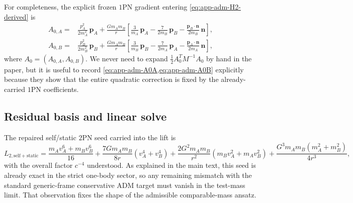 \documentclass[11pt]{article}
\newcommand{\pvec}{\mathbf p}
\newcommand{\nvec}{\mathbf n}
\newcommand{\OnePN}{\mathrm{1PN}}
\newcommand{\TwoPN}{\mathrm{2PN}}
\newcommand{\ADM}{\mathrm{ADM}}
\begin{document}
For completeness, the explicit frozen \(\OnePN\) gradient entering
\cref{eq:app-adm-H2-derived} is
\begin{align}
A_{0,A}
={}&
\frac{p_A^2}{2m_A^2}\,\pvec_A
+\frac{Gm_A m_B}{r}
\left[
\frac{3}{m_A}\,\pvec_A
-\frac{7}{2m_B}\,\pvec_B
-\frac{\pvec_B\!\cdot\!\nvec}{2m_B}\,\nvec
\right],
\label{eq:app-adm-A0A}
\\
A_{0,B}
={}&
\frac{p_B^2}{2m_B^2}\,\pvec_B
+\frac{Gm_A m_B}{r}
\left[
\frac{3}{m_B}\,\pvec_B
-\frac{7}{2m_A}\,\pvec_A
-\frac{\pvec_A\!\cdot\!\nvec}{2m_A}\,\nvec
\right],
\label{eq:app-adm-A0B}
\end{align}
where \(A_0=(A_{0,A},A_{0,B})\).  We never need to expand
\(\frac12 A_0^T M^{-1}A_0\) by hand in the paper, but it is useful to record
\cref{eq:app-adm-A0A,eq:app-adm-A0B} explicitly because they show that the entire
quadratic correction is fixed by the already-carried \(\OnePN\) coefficients.

\subsection{Residual basis and linear solve}
\label{app:adm-basis}

The repaired self/static \(\TwoPN\) seed carried into the lift is
\begin{equation}
L_{2,\mathrm{self+static}}
=
\frac{m_A v_A^6+m_B v_B^6}{16}
+\frac{7Gm_A m_B}{8r}(v_A^4+v_B^4)
+\frac{2G^2m_A m_B}{r^2}(m_B v_A^2+m_A v_B^2)
+\frac{G^3m_A m_B(m_A^2+m_B^2)}{4r^3},
\label{eq:app-adm-self-static-seed}
\end{equation}
with the overall factor \(c^{-4}\) understood.  As explained in the main text, this
seed is already exact in the strict one-body sector, so any remaining mismatch with the
standard generic-frame conservative \(\ADM\) target must vanish in the test-mass limit.
That observation fixes the shape of the admissible comparable-mass ansatz.
\end{document}
